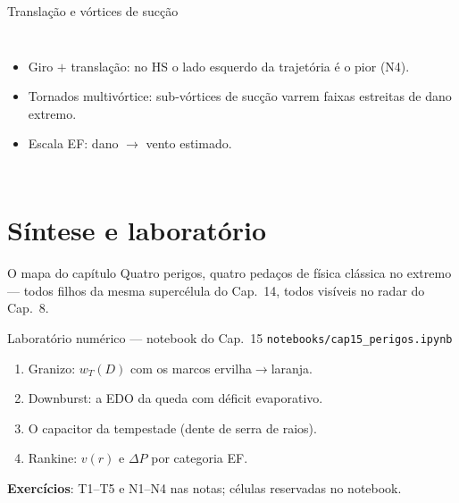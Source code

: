 \documentclass[aspectratio=169,11pt]{beamer}
\begin{document}
\begin{frame}{Translação e vórtices de sucção}
  \begin{columns}
    \begin{itemize}
      \item Giro $+$ translação: no HS o lado \alert{esquerdo} da
            trajetória é o pior (N4).
      \item Tornados multivórtice: sub-vórtices de sucção varrem
            faixas estreitas de dano extremo.
      \item Escala EF: dano $\to$ vento estimado.
    \end{itemize}
  \end{columns}
\end{frame}

\section{Síntese e laboratório}

\begin{frame}{O mapa do capítulo}
  \vspace{0.6em}
  Quatro perigos, quatro pedaços de física clássica no extremo — todos
  filhos da mesma supercélula do Cap.~14, todos visíveis no radar do
  Cap.~8.
\end{frame}

\begin{frame}{Laboratório numérico --- notebook do Cap.~15}
  \texttt{notebooks/cap15\_perigos.ipynb}
  \begin{enumerate}
    \item Granizo: $w_T(D)$ com os marcos ervilha$\to$laranja.
    \item Downburst: a EDO da queda com déficit evaporativo.
    \item O capacitor da tempestade (dente de serra de raios).
    \item Rankine: $v(r)$ e $\Delta P$ por categoria EF.
  \end{enumerate}
  \vspace{0.4em}
  \textbf{Exercícios}: T1--T5 e N1--N4 nas notas; células reservadas no
  notebook.
  \vfill
  \atribuicao
\end{frame}
\end{document}
